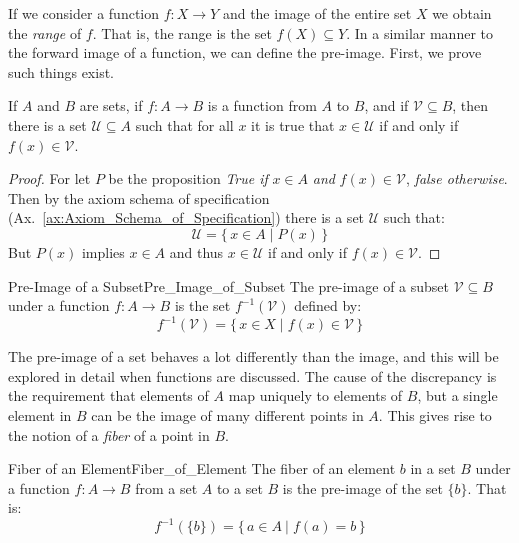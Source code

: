         If we consider a function $f:X\rightarrow{Y}$ and the image of the
        entire set $X$ we obtain the \textit{range} of $f$. That is, the range
        is the set $f(X)\subseteq{Y}$. In a similar manner to the forward image
        of a function, we can define the pre-image. First, we prove such things
        exist.
        \begin{theorem}
            \label{thm:Existence_of_Pre_Image}%
            If $A$ and $B$ are sets, if $f:A\rightarrow{B}$ is a function from
            $A$ to $B$, and if $\mathcal{V}\subseteq{B}$, then there is a set
            $\mathcal{U}\subseteq{A}$ such that for all $x$ it is true that
            $x\in\mathcal{U}$ if and only if $f(x)\in\mathcal{V}$.
        \end{theorem}
        \begin{proof}
            For let $P$ be the proposition \textit{True if} $x\in{A}$
            \textit{and} $f(x)\in\mathcal{V}$, \textit{false otherwise}. Then
            by the axiom schema of specification
            (Ax.~\ref{ax:Axiom_Schema_of_Specification}) there is a set
            $\mathcal{U}$ such that:
            \begin{equation*}
                \mathcal{U}=\big\{\,x\in{A}\;|\;P(x)\,\big\}
            \end{equation*}
            But $P(x)$ implies $x\in{A}$ and thus $x\in\mathcal{U}$ if and only
            if $f(x)\in\mathcal{V}$.
        \end{proof}
        \begin{fdefinition}{Pre-Image of a Subset}{Pre_Image_of_Subset}
            The pre-image of a subset $\mathcal{V}\subseteq{B}$ under a function
            $f:A\rightarrow{B}$ is the set $f^{\minus{1}}(\mathcal{V})$ defined
            by:
            \begin{equation}
                f^{\minus{1}}(\mathcal{V})
                =\big\{\,x\in{X}\;|\;f(x)\in\mathcal{V}\,\big\}
            \end{equation}
        \end{fdefinition}
        The pre-image of a set behaves a lot differently than the image, and
        this will be explored in detail when functions are discussed. The cause
        of the discrepancy is the requirement that elements of $A$ map uniquely
        to elements of $B$, but a single element in $B$ can be the image of
        many different points in $A$. This gives rise to the notion of a
        \textit{fiber} of a point in $B$.
        \begin{fdefinition}{Fiber of an Element}{Fiber_of_Element}
            The fiber of an element $b$ in a set $B$ under a function
            $f:A\rightarrow{B}$ from a set $A$ to a set $B$ is the pre-image
            of the set $\{b\}$. That is:
            \begin{equation*}
                f^{\minus{1}}(\{b\})
                =\big\{\,a\in{A}\:|\;f(a)=b\,\big\}
            \end{equation*}
        \end{fdefinition}
